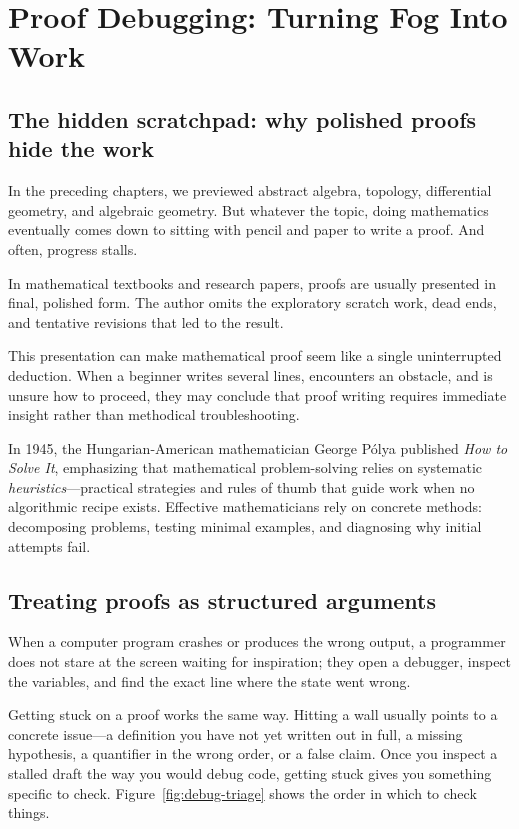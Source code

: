 \section{Proof Debugging: Turning Fog Into Work}
\chapterline

\subsection{The hidden scratchpad: why polished proofs hide the work}

In the preceding chapters, we previewed abstract algebra, topology, differential geometry, and algebraic geometry. But whatever the topic, doing mathematics eventually comes down to sitting with pencil and paper to write a proof. And often, progress stalls.

In mathematical textbooks and research papers, proofs are usually presented in final, polished form. The author omits the exploratory scratch work, dead ends, and tentative revisions that led to the result.

This presentation can make mathematical proof seem like a single uninterrupted deduction. When a beginner writes several lines, encounters an obstacle, and is unsure how to proceed, they may conclude that proof writing requires immediate insight rather than methodical troubleshooting.

In 1945, the Hungarian-American mathematician George P\'olya published \emph{How to Solve It}, emphasizing that mathematical problem-solving relies on systematic \emph{heuristics}---practical strategies and rules of thumb that guide work when no algorithmic recipe exists. Effective mathematicians rely on concrete methods: decomposing problems, testing minimal examples, and diagnosing why initial attempts fail.

\subsection{Treating proofs as structured arguments}

When a computer program crashes or produces the wrong output, a programmer does not stare at the screen waiting for inspiration; they open a debugger, inspect the variables, and find the exact line where the state went wrong.

Getting stuck on a proof works the same way. Hitting a wall usually points to a concrete issue---a definition you have not yet written out in full, a missing hypothesis, a quantifier in the wrong order, or a false claim. Once you inspect a stalled draft the way you would debug code, getting stuck gives you something specific to check. Figure~\ref{fig:debug-triage} shows the order in which to check things.

